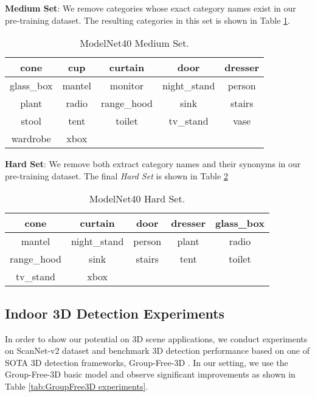 \documentclass[10pt,twocolumn,letterpaper]{article}
\begin{document}
\noindent\textbf{Medium Set}: We remove categories whose
exact category names exist in our pre-training dataset. The resulting categories in this set is shown in Table \ref{tab:ModelNet40-Medium-Set}.

\begin{table}[htb]
    \small
    \begin{tabular}{ccccc}
        \toprule
        cone& cup& curtain& door& dresser \\
        \midrule
        glass\_box& mantel& monitor& night\_stand& person \\
        \midrule
        plant& radio& range\_hood& sink& stairs \\
        \midrule
        stool& tent& toilet& tv\_stand& vase \\
        \midrule
        wardrobe& xbox \\
        \bottomrule
    \end{tabular}
    \caption{ModelNet40 Medium Set.}
    \label{tab:ModelNet40-Medium-Set}
\end{table}

\noindent\textbf{Hard Set}: We remove both extract category names and their synonyms in our pre-training dataset. The final \emph{Hard Set} is shown in Table \ref{tab:ModelNet40-Hard-Set}

\begin{table}[htb]
    \small
    \begin{tabular}{ccccc}
        \toprule
        cone& curtain& door& dresser& glass\_box \\
        \midrule
        mantel& night\_stand& person& plant& radio \\
        \midrule
        range\_hood& sink& stairs& tent& toilet \\
        \midrule
        tv\_stand& xbox \\
        \bottomrule
    \end{tabular}
    \caption{ModelNet40 Hard Set.}
    \label{tab:ModelNet40-Hard-Set}
\end{table}


\subsection{Indoor 3D Detection Experiments}
In order to show our potential on 3D scene applications, we conduct experiments on ScanNet-v2 dataset and benchmark 3D detection performance based on one of SOTA 3D detection frameworks, Group-Free-3D \cite{liu2021group}. In our setting, we use the Group-Free-3D basic model and observe significant improvements as shown in Table \ref{tab:GroupFree3D experiments}.
\end{document}

